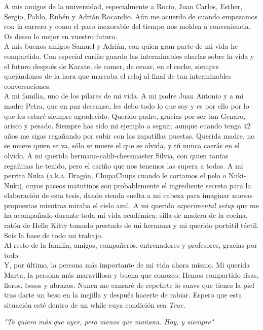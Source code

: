 A mis amigos de la universidad, especialmente a Rocío, Juan Carlos, Esther, Sergio, Pablo, Rubén y Adrián Rocandio. Aún me acuerdo de cuando empezamos con la carrera y como el paso inexorable del tiempo nos moldea a conveniencia. Os deseo lo mejor en vuestro futuro. \\

A mis buenos amigos Samuel y Adrián, con quien gran parte de mi vida he compartido. Con especial cariño guardo las interminables charlas sobre la vida y el futuro después de Karate, de comer, de cenar, en el coche, siempre quejándonos de la hora que marcaba el reloj al final de tan interminables conversaciones. \\

A mi familia, uno de los pilares de mi vida. A mi padre Juan Antonio y a mi madre Petra, que en paz descanse, les debo todo lo que soy y es por ello por lo que les estaré siempre agradecido. Querido padre, gracias por ser tan Genaro, arisco y pesado. Siempre has sido mi ejemplo a seguir, aunque cuando tenga 42 años me sigas regañando por subir con las zapatillas puestas. Querida madre, no se muere quien se va, sólo se muere el que se olvida, y tú nunca caerás en el olvido. A mi querida hermana-calili-chessmaster Silvia, con quien tantas regañinas he tenido, pero el cariño que nos tenemos las supera a todas. A mi perrita Nuka (a.k.a. Dragón, ChupaChups cuando le cortamos el pelo o Nuki-Nuki), cuyos paseos matutinos son probablemente el ingrediente secreto para la elaboración de esta tesis, dando rienda suelta a mi cabeza para imaginar nuevas propuestas mientras miraba el cielo azul. A mi querido \textit{experimental setup} que me ha acompañado durante toda mi vida académica: silla de madera de la cocina, ratón de Hello Kitty tomado prestado de mi hermana y mi querido portátil táctil. Sois la base de todo mi trabajo. \\ 

Al resto de la familia, amigos, compañeros, entrenadores y profesores, gracias por todo. \\

Y, por último, la persona más importante de mi vida ahora mismo. Mi querida Marta, la persona más maravillosa y buena que conozco. Hemos compartido risas, lloros, besos y abrazos. Nunca me cansaré de repetirte lo suave que tienes la piel tras darte un beso en la mejilla y después hacerte de rabiar. Espero que esta situación esté dentro de un while cuya condición sea \textit{True}. 

\begin{center}
\textit{"Te quiero más que ayer, pero menos que mañana. Hoy, y siempre"}
\end{center}

